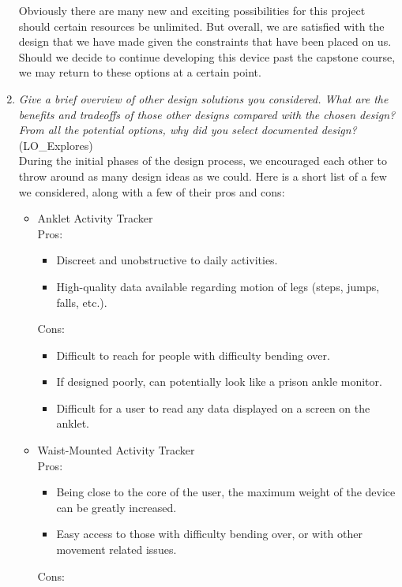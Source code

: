\documentclass[12pt, titlepage]{article}
\begin{document}
\begin{enumerate}
Obviously there are many new and exciting possibilities for this project should certain resources be unlimited. But overall, we are satisfied with the design that we have made given the constraints that have been placed on us. Should we decide to continue developing this device past the capstone course, we may return to these options at a certain point.\\

  \item \textit{Give a brief overview of other design solutions you considered.  What
  are the benefits and tradeoffs of those other designs compared with the chosen
  design?  From all the potential options, why did you select documented design?}
  (LO\_Explores)\\

During the initial phases of the design process, we encouraged each other to throw around as many design ideas as we could. Here is a short list of a few we considered, along with a few of their pros and cons:\\
\begin{itemize}
\item Anklet Activity Tracker\\
	Pros:
	\begin{itemize}
		\item Discreet and unobstructive to daily activities.
		\item High-quality data available regarding motion of legs (steps, jumps, falls, etc.).
	\end{itemize}
	Cons:
	\begin{itemize}
		\item Difficult to reach for people with difficulty bending over.
		\item If designed poorly, can potentially look like a prison ankle monitor.
		\item Difficult for a user to read any data displayed on a screen on the anklet.
	\end{itemize}
\item Waist-Mounted Activity Tracker\\
	Pros:
	\begin{itemize}
		\item Being close to the core of the user, the maximum weight of the device can be greatly increased.
		\item Easy access to those with difficulty bending over, or with other movement related issues.
	\end{itemize}
	Cons:
	\begin{itemize}

\end{itemize}
\end{itemize}
\end{enumerate}
\end{document}
